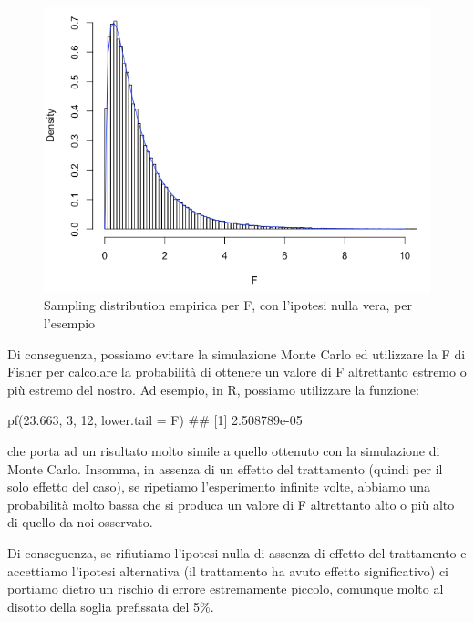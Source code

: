 \documentclass[a4paper,12pt,oneside]{book}
\newenvironment{Shaded}{}{}
\newcommand{\KeywordTok}[1]{#1}
\newcommand{\DataTypeTok}[1]{#1}
\newcommand{\DecValTok}[1]{#1}
\newcommand{\FloatTok}[1]{#1}
\newcommand{\CommentTok}[1]{#1}
\newcommand{\NormalTok}[1]{#1}
\begin{document}
\begin{figure}

{\centering \includegraphics[width=0.85\linewidth]{_images/SamplingDistribF} 

}

\caption{Sampling distribution empirica per F, con l'ipotesi nulla vera, per l'esempio}\label{fig:figName91}
\end{figure}

Di conseguenza, possiamo evitare la simulazione Monte Carlo ed utilizzare la F di Fisher per calcolare la probabilità di ottenere un valore di F altrettanto estremo o più estremo del nostro. Ad esempio, in R, possiamo utilizzare la funzione:

\begin{Shaded}
\begin{Highlighting}[]
\KeywordTok{pf}\NormalTok{(}\FloatTok{23.663}\NormalTok{, }\DecValTok{3}\NormalTok{, }\DecValTok{12}\NormalTok{, }\DataTypeTok{lower.tail =}\NormalTok{ F)}
\CommentTok{## [1] 2.508789e-05}
\end{Highlighting}
\end{Shaded}

che porta ad un risultato molto simile a quello ottenuto con la simulazione di Monte Carlo. Insomma, in assenza di un effetto del trattamento (quindi per il solo effetto del caso), se ripetiamo l'esperimento infinite volte, abbiamo una probabilità molto bassa che si produca un valore di F altrettanto alto o più alto di quello da noi osservato.

Di conseguenza, se rifiutiamo l'ipotesi nulla di assenza di effetto del trattamento e accettiamo l'ipotesi alternativa (il trattamento ha avuto effetto significativo) ci portiamo dietro un rischio di errore estremamente piccolo, comunque molto al disotto della soglia prefissata del 5\%.
\end{document}
